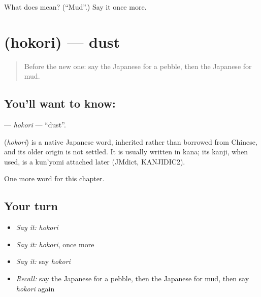 \begin{tcolorbox}[breakable,colback=teal!4,colframe=teal!35!black,title={Before you move on}]
What does  mean? (\textquotedblleft{}Mud\textquotedblright{}.) Say it once more.
\end{tcolorbox}
\section[\texorpdfstring{\ja{ほこり} (hokori)}{ほこり (hokori)}]{ (hokori) — dust}

\label{lesson:JA-C107-hokori}



\begin{quote}
Before the new one: say the Japanese for a pebble, then the Japanese for mud.
\end{quote}

\subsection*{You'll want to know: }
\textbf{} — \emph{hokori} — \textquotedblleft{}dust\textquotedblright{}.

\begin{cousinweb}
\textbf{} (\emph{hokori}) is a native Japanese word, inherited rather than borrowed from Chinese, and its older origin is not settled. It is usually written in kana; its kanji, when used, is a kun'yomi attached later (JMdict, KANJIDIC2).
\end{cousinweb}

\begin{grammarlens}[title={What you've built}]
One more word for this chapter.
\end{grammarlens}

\subsection*{Your turn}
\begin{itemize}
\raggedright
  \item \emph{Say it:} \emph{hokori}
  \item \emph{Say it:} \emph{hokori}, once more
  \item \emph{Say it:} say \emph{hokori}
  \item \emph{Recall:} say the Japanese for a pebble, then the Japanese for mud, then say \emph{hokori} again
\end{itemize}

